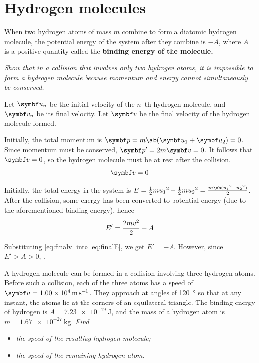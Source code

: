 \section{Hydrogen molecules}
When two hydrogen atoms of mass \(m\) combine to form a diatomic
hydrogen molecule,
the potential energy of the system after they combine is \(-A\),
where \(A\) is a positive quantity called the
\bf{binding energy} of the molecule.

\it{Show that in a collision that involves only two hydrogen atoms,
  it is impossible to form a
  hydrogen molecule because momentum and energy cannot simultaneously
be conserved.}

Let \(\mv{u}_n\) be the initial velocity of the \(n\)--th hydrogen molecule, and
\(\mv{v}_n\) be its final velocity. Let \(\mv{v}\) be the final velocity of the
hydrogen molecule formed.

Initially, the total momentum is \(\mv{p} = m\ab(\mv{u}_1 + \mv{u}_2)
= 0\). Since momentum
must be conserved, \(\mv{p}' = 2m\mv{v} = 0\). It follows that
\(\mv{v} = 0\), so
the hydrogen molecule must be at rest after the collision.
\begin{equation}
  \mv{v} = 0
  \label{eq:finalv}
\end{equation}

Initially, the total energy in the system is \(E = \f{1}{2}m{u_1}^2 +
\f{1}{2}m{u_2}^2 = \f{m\ab({u_1}^2 + {u_2}^2)}{2}\).
After the collision, some energy has been converted to potential
energy (due to the aforementioned binding energy),
hence
\begin{equation}
  E' = \frac{2mv^2}{2} - A
  \label{eq:finalE}
\end{equation}

Substituting \cref{eq:finalv} into \cref{eq:finalE}, we get \(E' = -A\).
However, since \(E' > A > 0\), .

A hydrogen molecule can be formed in a collision involving three
hydrogen atoms.
Before such a collision, each of the three atoms has a speed of
\(\mv{u}=\qty{1.00e4}{\metre\per\second}\). They approach at angles
of \qty{120}{\degree}
so that at any instant, the atoms lie at the corners of an equilateral triangle.
The binding energy of hydrogen is \(A = \qty{7.23e-19}{\joule}\), and the mass
of a hydrogen atom is \(m = \qty{1.67e-27}{\kg}\). \it{Find}
\begin{itemize}
  \item \it{the speed of the resulting hydrogen molecule;}
  \item \it{the speed of the remaining hydrogen atom.}
\end{itemize}

